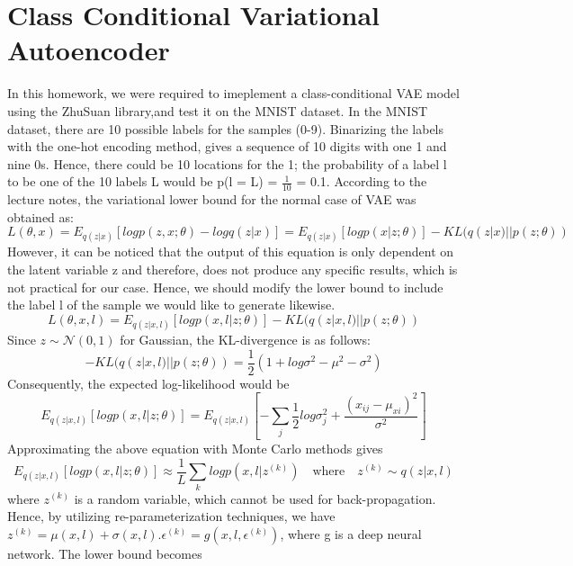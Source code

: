 \documentclass[12pt,a4paper]{article}
\begin{document}
	\section*{Class Conditional Variational Autoencoder}
	In this homework, we were required to imeplement a class-conditional VAE model using the ZhuSuan library,and test it on the MNIST dataset. In the MNIST dataset, there are 10 possible labels for the samples (0-9). Binarizing the labels with the one-hot encoding method, gives a sequence of 10 digits with one 1 and nine 0s. Hence, there could be 10 locations for the 1; the probability of a label l to be one of the 10 labels L would be p(l = L) = $\frac{1}{10}$ = 0.1. According to the lecture notes, the variational lower bound for the normal case of VAE was obtained as:
	\begin{equation*}
		L(\theta, x) = E_{q(z|x)}[logp(z,x;\theta)- logq(z|x)]=E_{q(z|x)}[logp(x|z;\theta)]- KL(q(z|x)||p(z;\theta))
	\end{equation*}
	However, it can be noticed that the output of this equation is only dependent on the latent variable z and therefore, does not produce any specific results, which is not practical for our case. Hence, we should modify the lower bound to include the label l of the sample we would like to generate likewise. 
	\begin{equation*}
		L(\theta, x, l) = E_{q(z|x, l)}[logp(x, l|z;\theta)]- KL(q(z|x, l)||p(z;\theta))
	\end{equation*}
	Since $z\sim \mathcal{N}(0, 1)$ for Gaussian,  the KL-divergence is as follows:
	\begin{equation}
		- KL(q(z|x, l)||p(z;\theta)) = \frac{1}{2}(1+log\sigma^2-\mu^2-\sigma^2)
	\end{equation}
	Consequently, the expected log-likelihood would be
	\begin{equation}
		E_{q(z|x, l)}[logp(x, l|z;\theta)] = E_{q(z|x, l)}[-\sum_{j}\frac{1}{2}	log\sigma_j^2+\frac{(x_{ij}-\mu_{xi})^2}{\sigma^2}]
	\end{equation}
	Approximating the above equation with Monte Carlo methods gives
	\begin{equation}
		E_{q(z|x, l)}[logp(x, l|z;\theta)] \approx \frac{1}{L}\sum_{k}logp(x,l|z^{(k)})\quad\text{where}\quad z^{(k)} \sim q(z|x,l)
	\end{equation}
	where $z^{(k)}$ is a random variable, which cannot be used for back-propagation. Hence, by utilizing re-parameterization techniques, we have $z^{(k)} = \mu(x, l)+\sigma(x, l).\epsilon^{(k)} = g(x, l, \epsilon^{(k)})$, where g is a deep neural network. The lower bound becomes
\end{document}
